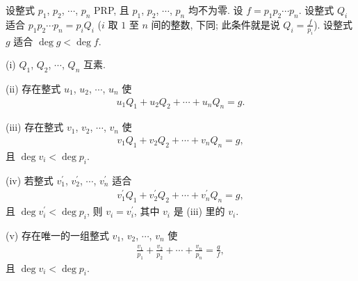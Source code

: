 \begin{proposition}
    设整式 $p_1$, $p_2$, $\cdots$, $p_n$ PRP, 且 $p_1$, $p_2$, $\cdots$, $p_n$ 均不为零. 设 $f = p_1 p_2 \cdots p_n$. 设整式 $Q_i$ 适合 $p_1 p_2 \cdots p_n = p_i Q_i$ ($i$ 取 $1$ 至 $n$ 间的整数, 下同; 此条件就是说 $Q_i = \frac{f}{p_i}$). 设整式 $g$ 适合 $\deg g < \deg f$.

    (i) $Q_1$, $Q_2$, $\cdots$, $Q_n$ 互素.

    (ii) 存在整式 $u_1$, $u_2$, $\cdots$, $u_n$ 使
    \begin{align*}
        u_1 Q_1 + u_2 Q_2 + \cdots + u_n Q_n = g.
    \end{align*}

    (iii) 存在整式 $v_1$, $v_2$, $\cdots$, $v_n$ 使
    \begin{align*}
        v_1 Q_1 + v_2 Q_2 + \cdots + v_n Q_n = g,
    \end{align*}
    且 $\deg v_i < \deg p_i$.

    (iv) 若整式 $v_1^{\prime}$, $v_2^{\prime}$, $\cdots$, $v_n^{\prime}$ 适合
    \begin{align*}
        v_1^{\prime} Q_1 + v_2^{\prime} Q_2 + \cdots + v_n^{\prime} Q_n = g,
    \end{align*}
    且 $\deg v_i^{\prime} < \deg p_i$, 则 $v_i = v_i^{\prime}$, 其中 $v_i$ 是 (iii) 里的 $v_i$.

    (v) 存在唯一的一组整式 $v_1$, $v_2$, $\cdots$, $v_n$ 使
    \begin{align*}
        \frac{v_1}{p_1} + \frac{v_2}{p_2} + \cdots + \frac{v_n}{p_n} = \frac{g}{f},
    \end{align*}
    且 $\deg v_i < \deg p_i$.
\end{proposition}

